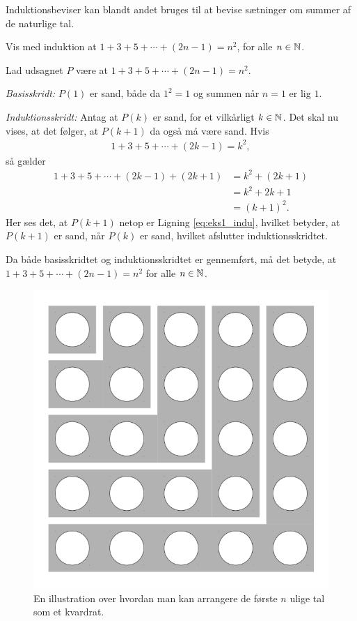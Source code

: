 Induktionsbeviser kan blandt andet bruges til at bevise sætninger om summer af de naturlige tal.
\begin{exmp}
	Vis med induktion at $1 + 3 + 5 + \dotsb + (2n-1) = n^2$, for alle $n \in \mathbb{N}$.

	Lad udsagnet $P$ være at $1 + 3 + 5 + \dotsb + (2n-1) = n^2$.
	
	\textit{Basisskridt:} $P(1)$ er sand, både da $1^2 = 1$ og summen når $n = 1$ er lig $1$.

	\textit{Induktionsskridt:} Antag at $P(k)$ er sand, for et vilkårligt $k \in \mathbb{N}$.
	Det skal nu vises, at det følger, at $P(k + 1)$ da også må være sand. 
	Hvis
	\begin{align}
		1 + 3 + 5 + \dotsb + (2k-1) 
		= k^2, \nonumber
	\end{align}
	så gælder
	\begin{align}
		1 + 3 + 5 + \dotsb + (2k-1) + (2k+1) 
		&= k^2 + (2k + 1) \nonumber \\
		&= k^2 + 2k + 1 \nonumber \\
		&= \left( k + 1 \right) ^2. \label{eq:eks1_indu}
	\end{align}
	Her ses det, at $P(k + 1)$ netop er Ligning \eqref{eq:eks1_indu}, hvilket betyder, at $P(k + 1)$ er sand, når $P(k)$ er sand, hvilket afslutter induktionsskridtet.

	Da både basisskridtet og induktionsskridtet er gennemført, må det betyde, at $1 + 3 + 5 + \dotsb + (2n-1) = n^2$ for alle $n \in \mathbb{N}$.
\end{exmp}

\begin{figure}
	\centering
	\includegraphics[scale=0.21]{fig/img/sum_of_n_first_odd_integers.png}
	\caption{En illustration over hvordan man kan arrangere de første $n$ ulige tal som et kvardrat.} \label{fig1_indu}
\end{figure}


